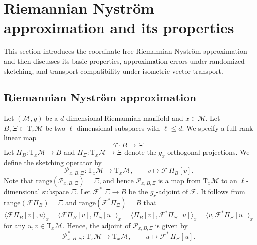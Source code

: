 \documentclass[final,onefignum,onetabnum]{siamart250211}
\begin{document}
\section{Riemannian Nystr\"om approximation and its properties}
\label{sec:sketching}
This section introduces the coordinate-free Riemannian Nystr\"om approximation and then discusses its basic properties, approximation errors under randomized sketching, and transport compatibility under isometric vector transport.

\subsection{Riemannian Nystr\"om approximation}
\label{subsec:Nystrom-manifold}
Let $(\mathcal{M}, g)$ be a $d$-dimensional Riemannian manifold and $x\in\mathcal M$.
Let $B, \Xi\subset \mathrm T_x\mathcal M$ be two $\ell$-dimensional subspaces with $\ell \le d$.
 We specify a full-rank linear map
\begin{equation*}
  \label{eq:F}
\mathcal{F}:B\to \Xi.
\end{equation*}
Let $\Pi_{B}:\mathrm T_x\mathcal M\to B$ and $\Pi_{\Xi}:\mathrm T_x\mathcal M\to\Xi$ denote the $g_x$-orthogonal projections.
We define the sketching operator by
\begin{equation}
  \label{eq:Px-coordfree}
\mathcal P_{x,B,\Xi}\colon \mathrm{T}_x\mathcal{M} \to \mathrm{T}_x\mathcal{M}, \qquad 
v \mapsto \mathcal{F}\,\Pi_{B}[v].
\end{equation}
Note that $\mathrm{range}(\mathcal{P}_{x,B,\Xi})=\Xi$, and hence $\mathcal{P}_{x,B,\Xi}$ is a map from $\mathrm{T}_x\mathcal{M}$ to an $\ell$-dimensional subspace $\Xi$.
Let $\mathcal F^*:\Xi\to B$ be the $g_x$-adjoint of $\mathcal{F}$. It follows from $\mathrm{range}(\mathcal{F}\Pi_B)=\Xi$ and $\mathrm{range}(\mathcal{F}^*\Pi_\Xi)=B$ that 
\[
\langle \mathcal F\Pi_B[v],u\rangle_x
=\langle \mathcal F\Pi_B[v],\Pi_\Xi[u]\rangle_x
=\langle \Pi_B[v],\mathcal F^*\Pi_\Xi[u]\rangle_x
=\langle v,\mathcal F^*\Pi_\Xi[u]\rangle_x
\]
for any \(u,v\in \mathrm T_x\mathcal M\). Hence, the adjoint of $\mathcal{P}_{x,B,\Xi}$ is given by
\begin{equation}
  \label{eq:Px*-coordfree}
 \mathcal P^{*}_{x,B,\Xi} \colon \mathrm{T}_x\mathcal{M} \to \mathrm{T}_x\mathcal{M}, \qquad 
 u \mapsto \mathcal{F}^{*}\,\Pi_{\Xi}[u].
\end{equation}
\end{document}
